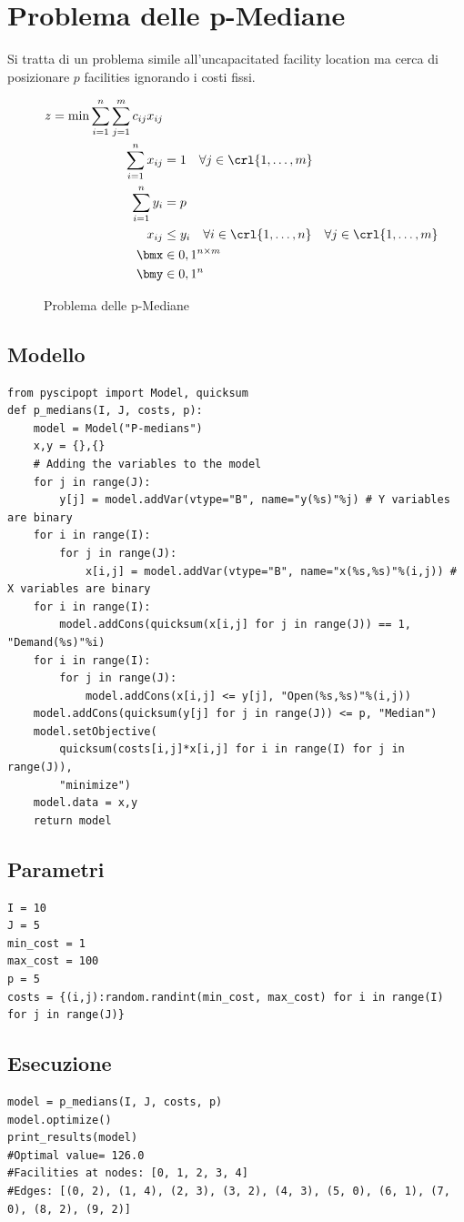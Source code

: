\documentclass[\main/main.tex]{subfiles}
\begin{document}
\chapter{Problema delle p-Mediane}
Si tratta di un problema simile all'uncapacitated facility location ma cerca di posizionare \(p\) facilities ignorando i costi fissi.

\begin{figure}
    \begin{align*}
        z = \min \sum_{i=1}^n \sum_{j=1}^m c_{ij} x_{ij} \\
        \sum_{i=1}^n x_{ij} &= 1 \quad \forall j \in \crl{1, \ldots, m}\\
        \sum_{i=1}^n y_{i} &= p\\
        x_{ij} &\leq y_i \quad \forall i \in \crl{1, \ldots, n} \quad \forall j \in \crl{1, \ldots, m}\\
        \bmx &\in {0,1}^{n\times m}\\
        \bmy &\in {0,1}^n
    \end{align*}
    \caption{Problema delle p-Mediane}
\end{figure}

\section{Modello}
\begin{verbatim}
from pyscipopt import Model, quicksum
def p_medians(I, J, costs, p):
    model = Model("P-medians")
    x,y = {},{}
    # Adding the variables to the model
    for j in range(J):
        y[j] = model.addVar(vtype="B", name="y(%s)"%j) # Y variables are binary
    for i in range(I):
        for j in range(J):
            x[i,j] = model.addVar(vtype="B", name="x(%s,%s)"%(i,j)) # X variables are binary
    for i in range(I):
        model.addCons(quicksum(x[i,j] for j in range(J)) == 1, "Demand(%s)"%i)
    for i in range(I):
        for j in range(J):
            model.addCons(x[i,j] <= y[j], "Open(%s,%s)"%(i,j))
    model.addCons(quicksum(y[j] for j in range(J)) <= p, "Median")
    model.setObjective(
        quicksum(costs[i,j]*x[i,j] for i in range(I) for j in range(J)),
        "minimize")
    model.data = x,y
    return model
\end{verbatim}

\section{Parametri}
\begin{verbatim}
I = 10
J = 5
min_cost = 1
max_cost = 100
p = 5
costs = {(i,j):random.randint(min_cost, max_cost) for i in range(I) for j in range(J)}
\end{verbatim}
\section{Esecuzione}
\begin{verbatim}
model = p_medians(I, J, costs, p)
model.optimize()
print_results(model)
#Optimal value= 126.0
#Facilities at nodes: [0, 1, 2, 3, 4]
#Edges: [(0, 2), (1, 4), (2, 3), (3, 2), (4, 3), (5, 0), (6, 1), (7, 0), (8, 2), (9, 2)]
\end{verbatim}
\end{document}
